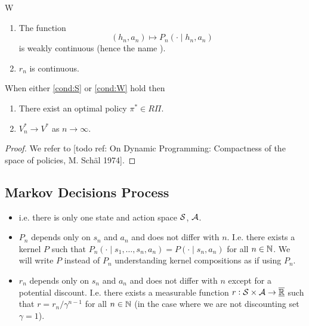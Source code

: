 \begin{cond}{W}
  \begin{enumerate}
    \item The function
      \[(h_n, a_n) \mapsto P_n(\cdot \mid h_n, a_n)\]
	is weakly continuous (hence the name ).
    \item $r_n$ is continuous.
  \end{enumerate}
  \label{cond:W}
\end{cond}

\begin{thm}
  When either \cref{cond:S} or \cref{cond:W} hold then
  \begin{enumerate}
    \item There exist an optimal policy $\pi^* \in R\Pi$.
    \item $V^*_n \to V^*$ as $n \to \infty$.
  \end{enumerate}
\end{thm}
\begin{proof}
  We refer to [todo ref: On Dynamic Programming: Compactness of the space of
  policies, M. Schäl 1974]. %
\end{proof}

\subsection{Markov Decisions Process}

\begin{sett}
  \begin{itemize}
    \item {} i.e. there is only one state
      and action space $\mathcal{S}$, $\mathcal{A}$.
    \item $P_n$ depends only on $s_n$ and $a_n$ and does not
      differ with $n$. I.e. there exists a kernel $P$ such that
      $P_n(\cdot \mid s_1, \dots, s_n, a_n) = P(\cdot \mid s_n, a_n)$
      for all $n \in \mathbb{N}$. We will write $P$ instead of $P_n$ understanding
      kernel compositions as if using $P_n$.
    \item $r_n$ depends only on $s_n$ and $a_n$ and does not differ
      with $n$ except for a potential discount.
      I.e. there exists a measurable function
      $r:\mathcal{S}\times\mathcal{A} \to \overline{\underline{\mathbb{R}}}$
      such that
      $r = r_n/\gamma^{n-1}$ for all $n \in \mathbb{N}$ (in the case where we 
      are not discounting set $\gamma = 1$).
  \end{itemize}
  \label{sett:MDP}
\end{sett}
%

